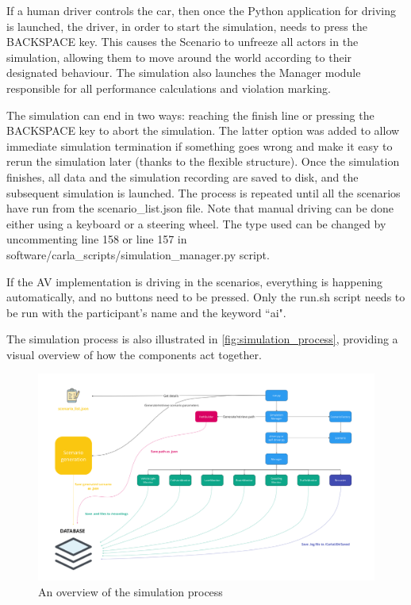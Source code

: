 If a human driver controls the car, then once the Python application for driving is launched, the driver, in order to start the simulation, needs to press the BACKSPACE key. This causes the Scenario to unfreeze all actors in the simulation, allowing them to move around the world according to their designated behaviour. The simulation also launches the Manager module responsible for all performance calculations and violation marking.

The simulation can end in two ways: reaching the finish line or pressing the BACKSPACE key to abort the simulation. The latter option was added to allow immediate simulation termination if something goes wrong and make it easy to rerun the simulation later (thanks to the flexible structure). Once the simulation finishes, all data and the simulation recording are saved to disk, and the subsequent simulation is launched. The process is repeated until all the scenarios have run from the scenario\_list.json file. Note that manual driving can be done either using a keyboard or a steering wheel. The type used can be changed by uncommenting line 158 or line 157 in software/carla\_scripts/simulation\_manager.py script.

If the AV implementation is driving in the scenarios, everything is happening automatically, and no buttons need to be pressed. Only the run.sh script needs to be run with the participant's name and the keyword ``ai".

The simulation process is also illustrated in \autoref{fig:simulation_process}, providing a visual overview of how the components act together.

\begin{figure}
    \centering
    \includegraphics[width = \textwidth]{research_paper/Images/simulation_process.png}
    \caption{An overview of the simulation process}
    \label{fig:simulation_process}
\end{figure}

